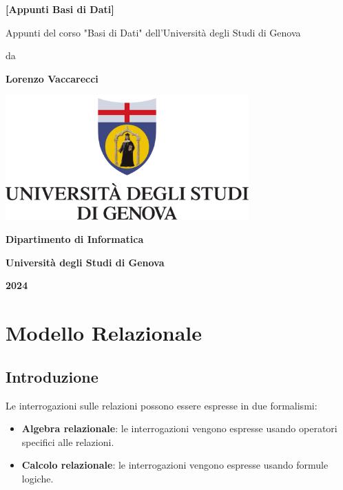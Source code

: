 \documentclass[12pt, a4paper]{report}
\begin{document}
    \begin{titlepage}
        \centering
        {\Huge \bfseries{[Appunti Basi di Dati]}\par}
        \vspace{1cm}
        {\large Appunti del corso "Basi di Dati" dell'Università degli Studi di Genova\par}  %
        \vspace{1cm}
        {\large da\par}
        \vspace{2cm}
        {\Large\bfseries Lorenzo Vaccarecci\par}
        \vspace{1cm}
        \includegraphics[width=0.7\textwidth]{Appunti Latex/Immagini/logoUnige.png}\\
        \vspace{1cm}
        {\Large\bfseries Dipartimento di Informatica\par}
        {\Large\bfseries Università degli Studi di Genova\par}
        {\Large\bfseries 2024\par}
    \end{titlepage}
    \tableofcontents
    \chapter{Modello Relazionale}
        \section{Introduzione}
            Le interrogazioni sulle relazioni possono essere espresse in due formalismi:
            \begin{itemize}
                \item \textbf{Algebra relazionale}: le interrogazioni vengono espresse usando operatori specifici alle relazioni.
                \item \textbf{Calcolo relazionale}: le interrogazioni vengono espresse usando formule logiche.
            \end{itemize}
\end{document}
